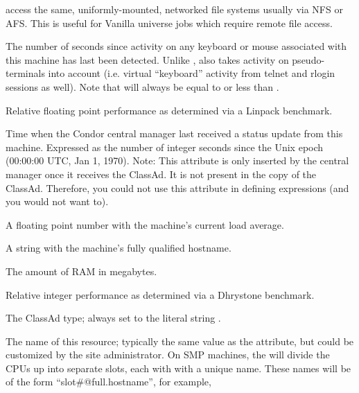 \begin{description}
access the same, uniformly-mounted, networked file systems usually via
NFS or AFS.  This is useful for Vanilla universe jobs which require
remote file access.
%
\item[\AdAttr{KeyboardIdle}:] The number of seconds since activity on any
keyboard or mouse associated with this machine has last been detected.
Unlike ,  also takes activity 
on pseudo-terminals into
account (i.e. virtual ``keyboard'' activity from telnet and rlogin
sessions as well).  Note that  will always be equal to or
less than .
%
\item[\AdAttr{KFlops}:] Relative floating point performance as determined via a
Linpack benchmark.
%
\item[\AdAttr{LastHeardFrom}:] Time when the Condor central manager last
received a status update from this machine.  
Expressed as 
the number of integer seconds since the Unix epoch (00:00:00 UTC, Jan 1, 1970).
Note: This attribute is only inserted by the central manager once it
receives the ClassAd.
It is not present in the  copy of the ClassAd.
Therefore, you could not use this attribute in defining 
expressions (and you would not want to).
%
\item[\AdAttr{LoadAvg}:] A floating point number with the machine's current load
average.
%
\item[\AdAttr{Machine}:] A string with the machine's fully qualified hostname.
%
\item[\AdAttr{Memory}:] The amount of RAM in megabytes.
%
\item[\AdAttr{Mips}:] Relative integer performance as determined via a Dhrystone
benchmark.
%
\item[\AdAttr{MyType}:] The ClassAd type; always set to the literal string .
%
\item[\AdAttr{Name}:] The name of this resource; typically the same value as
the  attribute, but could be customized by the site
administrator.
On SMP machines, the  will divide the CPUs up into separate
slots, each with with a unique name.
These names will be of the form ``slot\#@full.hostname'', for example,

\end{description}
